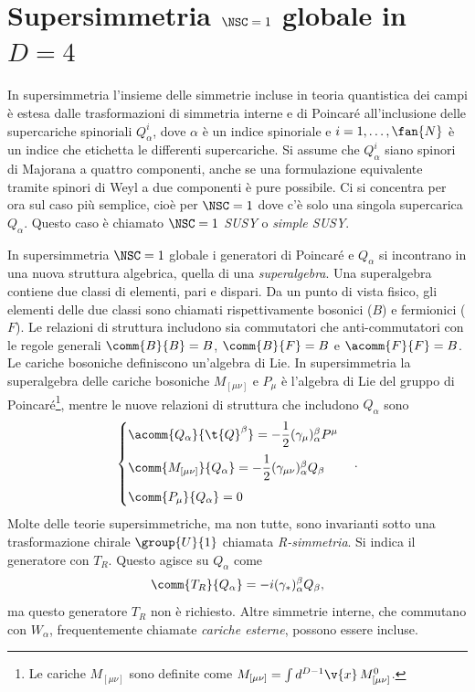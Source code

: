 \chapter{Supersimmetria \texorpdfstring{$\NSC = 1$}{N = 1} globale in \texorpdfstring{$D = 4$}{D = 4}}
In supersimmetria l'insieme delle simmetrie incluse in teoria quantistica dei campi è estesa dalle trasformazioni di simmetria interne e di Poincaré all'inclusione delle supercariche spinoriali $Q_\alpha^i$, dove $\alpha$ è un indice spinoriale e $i = 1,\dots,\fan{N}$ è un indice che etichetta le differenti supercariche. Si assume che $Q_\alpha^i$ siano spinori di Majorana a quattro componenti, anche se una formulazione equivalente tramite spinori di Weyl a due componenti è pure possibile. Ci si concentra per ora sul caso più semplice, cioè per $\NSC = 1$ dove c'è solo una singola supercarica $Q_\alpha$. Questo caso è chiamato \emph{$\NSC = 1$ SUSY} o \emph{simple SUSY}.

In supersimmetria $\NSC = 1$ globale i generatori di Poincaré e $Q_\alpha$ si incontrano in una nuova struttura algebrica, quella di una \emph{superalgebra}. Una superalgebra contiene due classi di elementi, pari e dispari. Da un punto di vista fisico, gli elementi delle due classi sono chiamati rispettivamente bosonici ($B$) e fermionici ($F$). Le relazioni di struttura includono sia commutatori che anti-commutatori con le regole generali $\comm{B}{B} = B$, $\comm{B}{F} = B$ e $\acomm{F}{F} = B$. Le cariche bosoniche definiscono un'algebra di Lie. In supersimmetria la superalgebra delle cariche bosoniche $M_{[\mu\nu]}$ e $P_\mu$ è l'algebra di Lie del gruppo di Poincaré\footnote{Le cariche $M_{[\mu\nu]}$ sono definite come $M_{[\mu\nu]} = \int d^{D - 1}\v{x}\,M^0_{[\mu\nu]}$.}, mentre le nuove relazioni di struttura che includono $Q_\alpha$ sono 
\begin{equation}
\label{eq: superalgebra per N = 1}
    \begin{cases}
        \acomm{Q_\alpha}{\t{Q}^\beta} = -\dfrac{1}{2}(\gamma_\mu)_\alpha^\beta P^\mu \\[2ex] 
        \comm{M_{[\mu\nu]}}{Q_\alpha} = -\dfrac{1}{2}(\gamma_{\mu\nu})_\alpha^\beta Q_\beta \\[2ex]
        \comm{P_\mu}{Q_\alpha} = 0
    \end{cases}.
\end{equation}
Molte delle teorie supersimmetriche, ma non tutte, sono invarianti sotto una trasformazione chirale $\group{U}{1}$ chiamata \emph{R-simmetria}. Si indica il generatore con $T_R$. Questo agisce su $Q_\alpha$ come 
\begin{equation}
    \comm{T_R}{Q_\alpha} = -i(\gamma_*)^\beta_\alpha Q_\beta,
\end{equation}
ma questo generatore $T_R$ non è richiesto. Altre simmetrie interne, che commutano con $W_\alpha$, frequentemente chiamate \emph{cariche esterne}, possono essere incluse.

